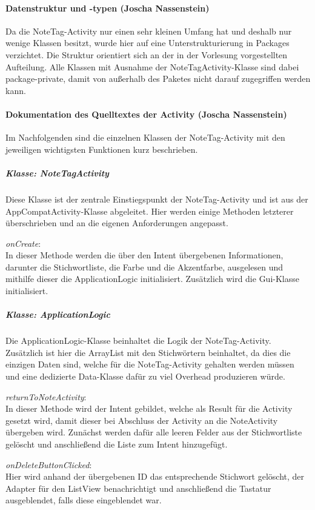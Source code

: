 \paragraph{Datenstruktur und -typen (Joscha Nassenstein)}
Da die NoteTag-Activity nur einen sehr kleinen Umfang hat und deshalb nur wenige Klassen besitzt, wurde hier auf eine Unterstrukturierung in Packages verzichtet. Die Struktur orientiert sich an der in der Vorlesung vorgestellten Aufteilung. Alle Klassen mit Ausnahme der NoteTagActivity-Klasse sind dabei package-private, damit von außerhalb des Paketes nicht darauf zugegriffen werden kann.

\paragraph{Dokumentation des Quelltextes der Activity (Joscha Nassenstein)}
Im Nachfolgenden sind die einzelnen Klassen der NoteTag-Activity mit den jeweiligen wichtigsten Funktionen kurz beschrieben.

\subparagraph{Klasse: NoteTagActivity}
Diese Klasse ist der zentrale Einstiegspunkt der NoteTag-Activity und ist aus der AppCompatActivity-Klasse abgeleitet. Hier werden einige Methoden letzterer überschrieben und an die eigenen Anforderungen angepasst.

\textit{onCreate}:\\
In dieser Methode werden die über den Intent übergebenen Informationen, darunter die Stichwortliste, die Farbe und die Akzentfarbe, ausgelesen und mithilfe dieser die ApplicationLogic initialisiert. Zusätzlich wird die Gui-Klasse initialisiert.

\subparagraph{Klasse: ApplicationLogic}
Die ApplicationLogic-Klasse beinhaltet die Logik der NoteTag-Activity. Zusätzlich ist hier die ArrayList mit den Stichwörtern beinhaltet, da dies die einzigen Daten sind, welche für die NoteTag-Activity gehalten werden müssen und eine dedizierte Data-Klasse dafür zu viel Overhead produzieren würde.

\textit{returnToNoteActivity}:\\
In dieser Methode wird der Intent gebildet, welche als Result für die Activity gesetzt wird, damit dieser bei Abschluss der Activity an die NoteActivity übergeben wird. Zunächst werden dafür alle leeren Felder aus der Stichwortliste gelöscht und anschließend die Liste zum Intent hinzugefügt.

\textit{onDeleteButtonClicked}:\\
Hier wird anhand der übergebenen ID das entsprechende Stichwort gelöscht, der Adapter für den ListView benachrichtigt und anschließend die Tastatur ausgeblendet, falls diese eingeblendet war.

